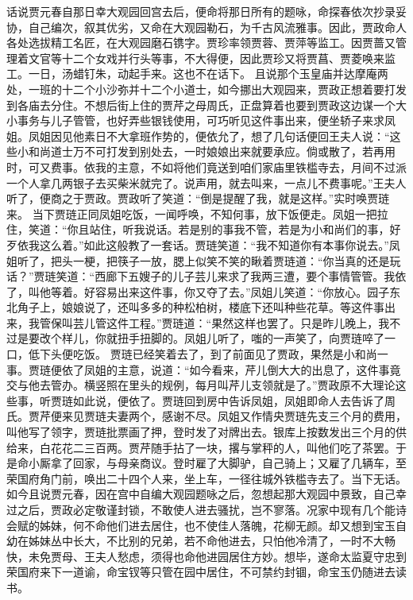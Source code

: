 \documentclass[12pt,oneside]{book}
\begin{document}
话说贾元春自那日幸大观园回宫去后，便命将那日所有的题咏，命探春依次抄录妥协，自己编次，叙其优劣，又命在大观园勒石，为千古风流雅事。因此，贾政命人各处选拔精工名匠，在大观园磨石镌字。贾珍率领贾蓉、贾萍等监工。因贾蔷又管理着文官等十二个女戏并行头等事，不大得便，因此贾珍又将贾菖、贾菱唤来监工。一日，汤蜡钉朱，动起手来。这也不在话下。
且说那个玉皇庙并达摩庵两处，一班的十二个小沙弥并十二个小道士，如今挪出大观园来，贾政正想着要打发到各庙去分住。不想后街上住的贾芹之母周氏，正盘算着也要到贾政这边谋一个大小事务与儿子管管，也好弄些银钱使用，可巧听见这件事出来，便坐轿子来求凤姐。凤姐因见他素日不大拿班作势的，便依允了，想了几句话便回王夫人说：“这些小和尚道士万不可打发到别处去，一时娘娘出来就要承应。倘或散了，若再用时，可又费事。依我的主意，不如将他们竟送到咱们家庙里铁槛寺去，月间不过派一个人拿几两银子去买柴米就完了。说声用，就去叫来，一点儿不费事呢。”王夫人听了，便商之于贾政。贾政听了笑道：“倒是提醒了我，就是这样。”实时唤贾琏来。
当下贾琏正同凤姐吃饭，一闻呼唤，不知何事，放下饭便走。凤姐一把拉住，笑道：“你且站住，听我说话。若是别的事我不管，若是为小和尚们的事，好歹依我这么着。”如此这般教了一套话。贾琏笑道：“我不知道你有本事你说去。”凤姐听了，把头一梗，把筷子一放，腮上似笑不笑的瞅着贾琏道：“你当真的还是玩话？”贾琏笑道：“西廊下五嫂子的儿子芸儿来求了我两三遭，要个事情管管。我依了，叫他等着。好容易出来这件事，你又夺了去。”凤姐儿笑道：“你放心。园子东北角子上，娘娘说了，还叫多多的种松柏树，楼底下还叫种些花草。等这件事出来，我管保叫芸儿管这件工程。”贾琏道：“果然这样也罢了。只是昨儿晚上，我不过是要改个样儿，你就扭手扭脚的。凤姐儿听了，嗤的一声笑了，向贾琏啐了一口，低下头便吃饭。
贾琏已经笑着去了，到了前面见了贾政，果然是小和尚一事。贾琏便依了凤姐的主意，说道：“如今看来，芹儿倒大大的出息了，这件事竟交与他去管办。横竖照在里头的规例，每月叫芹儿支领就是了。”贾政原不大理论这些事，听贾琏如此说，便依了。贾琏回到房中告诉凤姐，凤姐即命人去告诉了周氏。贾芹便来见贾琏夫妻两个，感谢不尽。凤姐又作情央贾琏先支三个月的费用，叫他写了领字，贾琏批票画了押，登时发了对牌出去。银库上按数发出三个月的供给来，白花花二三百两。贾芹随手拈了一块，撂与掌秤的人，叫他们吃了茶罢。于是命小厮拿了回家，与母亲商议。登时雇了大脚驴，自己骑上；又雇了几辆车，至荣国府角门前，唤出二十四个人来，坐上车，一径往城外铁槛寺去了。当下无话。
如今且说贾元春，因在宫中自编大观园题咏之后，忽想起那大观园中景致，自己幸过之后，贾政必定敬谨封锁，不敢使人进去骚扰，岂不寥落。况家中现有几个能诗会赋的姊妹，何不命他们进去居住，也不使佳人落魄，花柳无颜。却又想到宝玉自幼在姊妹丛中长大，不比别的兄弟，若不命他进去，只怕他冷清了，一时不大畅快，未免贾母、王夫人愁虑，须得也命他进园居住方妙。想毕，遂命太监夏守忠到荣国府来下一道谕，命宝钗等只管在园中居住，不可禁约封锢，命宝玉仍随进去读书。
\end{document}
